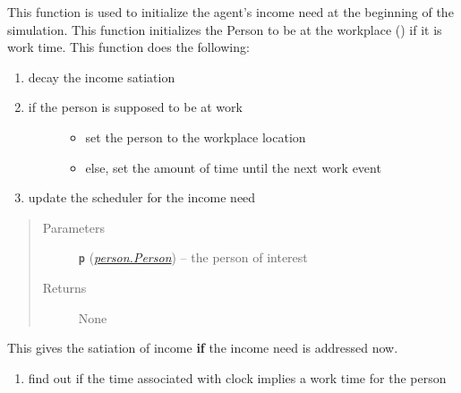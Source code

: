 \documentclass[letterpaper,10pt,english]{sphinxmanual}
\begin{document}
\begin{fulllineitems}
\begin{fulllineitems}
\end{fulllineitems}


\begin{fulllineitems}
\label{income:income.Income.initialize}
This function is used to initialize the agent's income need at the beginning of the simulation.         This function initializes the Person to be at the workplace () if it is work time.         This function does the following:
\begin{enumerate}
\item {} 
decay the income satiation

\item {} \begin{description}
\item[{if the person is supposed to be at work}] \leavevmode\begin{itemize}
\item {} 
set the person to the workplace location

\item {} 
else, set the amount of time until the next work event

\end{itemize}

\end{description}

\item {} 
update the scheduler for the income need

\end{enumerate}
\begin{quote}\begin{description}
\item[{Parameters}] \leavevmode
\textbf{\texttt{p}} ({\hyperref[person:person.Person]{\emph{\emph{person.Person}}}}) -- the person of interest

\item[{Returns}] \leavevmode
None

\end{description}\end{quote}

\end{fulllineitems}


\begin{fulllineitems}
\label{income:income.Income.perceive}
This gives the satiation of income \textbf{if} the income need is addressed now.
\begin{enumerate}
\item {} 
find out if the time associated with clock implies a work time for the person


\end{enumerate}
\end{fulllineitems}
\end{fulllineitems}
\end{document}
